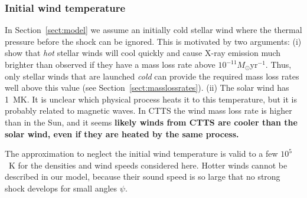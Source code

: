 \subsubsection{Initial wind temperature}
\label{sect:T_0}
In Section~\ref{sect:model} we assume an initially cold stellar wind where the thermal pressure before the shock can be ignored. This is motivated by two arguments: (i) \citet{2007IAUS..243..299M} show that {\it hot} stellar winds will cool quickly and cause X-ray emission much brighter than observed if they have a mass loss rate above $10^{-11}M_\odot\mathrm{ yr}^{-1}$. Thus, only stellar winds that are launched {\it cold} can provide the required mass loss rates well above this value (see Section~\ref{sect:masslossrates}). (ii) The solar wind has 1~MK. It is unclear which physical process heats it to this temperature, but it is probably related to magnetic waves. In CTTS the wind mass loss rate is  higher than in the Sun, and it seems \textbf{likely winds from CTTS are cooler than the solar wind, even if they are heated by the same process.}

The approximation to neglect the initial wind temperature is valid to a few $10^5$~K for the densities and wind speeds considered here. Hotter winds cannot be described in our model, because their sound speed is so large that no strong shock develops for small angles $\psi$.